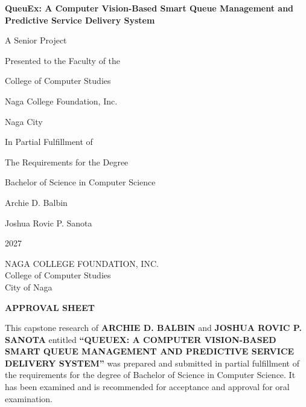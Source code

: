 \documentclass{research}
\makeatletter
\newcommand{\sysname}{QueuEx}
\let\QXorigaddvspace\addvspace
\newcommand{\QXsmallvspace}[1]{\QXorigaddvspace{4\p@}}
\newcommand{\QXtightlist}{\let\addvspace\QXsmallvspace}
\makeatother
\begin{document}
\addtocontents{lot}{\protect\QXtightlist}
\addtocontents{lof}{\protect\QXtightlist}

\begin{titlepage}
\centering
\vspace*{0.95in}
{\LARGE\bfseries \sysname{}: A Computer Vision-Based Smart Queue Management and
Predictive Service Delivery System\par}
\vfill
{A Senior Project\par
\medskip
Presented to the Faculty of the\par
College of Computer Studies\par
Naga College Foundation, Inc.\par
Naga City\par}
\vfill
{In Partial Fulfillment of\par
The Requirements for the Degree\par
Bachelor of Science in Computer Science\par}
\vfill
{Archie D. Balbin\par
Joshua Rovic P. Sanota\par}
\vfill
{2027\par}
\end{titlepage}

\setcounter{page}{2}
\pagestyle{empty}

\begingroup
\small
\begin{center}
NAGA COLLEGE FOUNDATION, INC.\\
College of Computer Studies\\
City of Naga
\end{center}
\vspace{0.6em}
\begin{center}
\textbf{APPROVAL SHEET}
\end{center}
\vspace{0.6em}

\noindent This capstone research of \textbf{ARCHIE D. BALBIN} and
\textbf{JOSHUA ROVIC P. SANOTA}
entitled \textbf{``QUEUEX: A COMPUTER VISION-BASED SMART QUEUE MANAGEMENT AND
PREDICTIVE SERVICE DELIVERY SYSTEM''} was prepared and submitted in
partial fulfillment of the requirements for the degree of Bachelor of
Science in Computer Science. It has been examined and is recommended
for acceptance and approval for oral examination.
\end{document}
